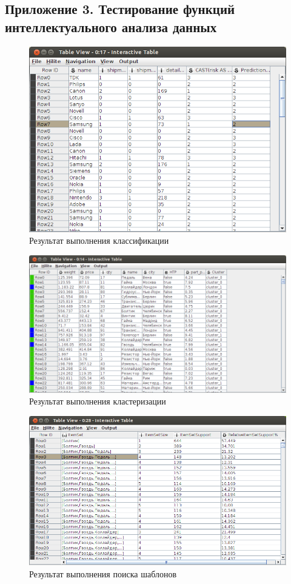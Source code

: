 \newpage
\subsection{Приложение 3. Тестирование функций интеллектуального анализа данных}

\begin{figure}[h]
  \centering
  \includegraphics[scale=0.43]{classification.png}
  \caption{Результат выполнения классификации}
  \label{knime-classification}
\end{figure}

\begin{figure}[h]
  \centering
  \includegraphics[scale=0.43]{clusters.png}
  \caption{Результат выполнения кластеризации}
  \label{knime-clasterisation}
\end{figure}

\begin{figure}[h]
  \centering
  \includegraphics[scale=0.43]{freq_patterns.png}
  \caption{Результат выполнения поиска шаблонов}
  \label{knime-patterns}
\end{figure}

